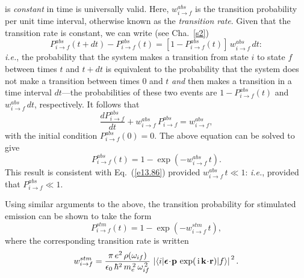 is {\em constant}\/ in time is universally valid. Here, $w_{i\rightarrow f}^{abs}$
is the transition probability per unit time interval, otherwise known
as the {\em transition rate}. Given that the transition rate is constant,
we can write (see Cha.~\ref{s2})
\begin{equation}
P_{i\rightarrow f}^{abs}(t+dt) - P_{i\rightarrow f}^{abs}(t) =\left[1-P_{i\rightarrow f}^{abs}(t)\right]\,w_{i\rightarrow f}^{abs}\,dt:
\end{equation}
{\em i.e.}, the probability that the system makes a transition from state
$i$ to state $f$
between times $t$ and $t+dt$ is equivalent to the probability that the
system does not make a transition between times 0 and $t$ {\em and}\/ then makes
a transition in a time interval $dt$---the probabilities of these two events are
$1-P_{i\rightarrow f}^{abs}(t)$ and $w_{i\rightarrow f}^{abs}\,dt$,
respectively. It follows that
\begin{equation}
\frac{dP_{i\rightarrow f}^{abs}}{dt} + w_{i\rightarrow f}^{abs}\,P_{i\rightarrow f}^{abs} = w_{i\rightarrow f}^{abs},
\end{equation}
with the initial condition  $P_{i\rightarrow f}^{abs}(0)=0$. The
above equation can be solved to give
\begin{equation}
P_{i\rightarrow f}^{abs}(t) = 1 - \exp\left(-w_{i\rightarrow f}^{abs}\,t\right).
\end{equation}
This result is consistent with Eq.~(\ref{e13.86}) provided
$w_{i\rightarrow f}^{abs}\,t \ll 1$: {\em i.e.}, provided
that $P^{abs}_{i\rightarrow f}\ll 1$.

Using similar arguments to the above, the transition probability for
stimulated emission can be shown to take the form
\begin{equation}
P_{i\rightarrow f}^{stm}(t) = 1 - \exp\left(-w_{i\rightarrow f}^{stm}\,t\right),
\end{equation}
where the corresponding transition rate is written
\begin{equation}
w_{i\rightarrow f}^{stm} =
\frac{\pi\,e^2\,\rho(\omega_{if})}{\epsilon_0\,\hbar^2\,m_e^{\,2}\,\omega_{if}^{\,2}}\,\left|\langle i|\mbox{\boldmath$\epsilon$}\!\cdot\!{\bf p}\,\exp(\,{\rm i}\,{\bf k}\!\cdot\!{\bf r})|f\rangle\right|^{\,2}.
\end{equation}

